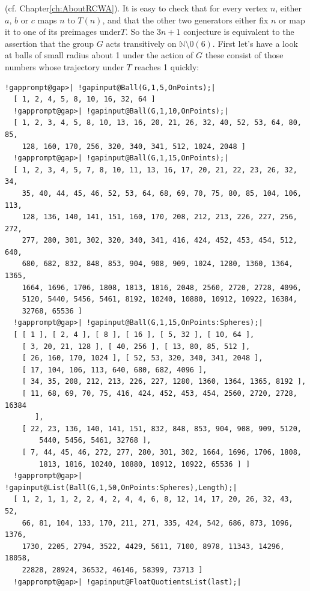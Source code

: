 \documentclass[a4paper,11pt]{report}
\begin{document}
{{   (cf. Chapter{\nobreakspace}\ref{ch:AboutRCWA}). It is easy to check that for every vertex $n$, either $a$, $b$ or $c$ maps $n$ to $T(n)$, and that the other two generators either fix $n$ or map it to one of its preimages under{\nobreakspace}$T$. So the $3n+1$ conjecture is equivalent to the assertion that the group $G$ acts transitively on $\mathbb{N} \setminus 0(6)$. First let's have a look at balls of small radius about 1 under the action of $G$ \texttt{}\texttt{} these consist of those numbers whose
trajectory under $T$ reaches 1 quickly: 
\begin{Verbatim}[commandchars=!@|,fontsize=\small,frame=single,label=Example]
  !gapprompt@gap>| !gapinput@Ball(G,1,5,OnPoints);|
  [ 1, 2, 4, 5, 8, 10, 16, 32, 64 ]
  !gapprompt@gap>| !gapinput@Ball(G,1,10,OnPoints);|
  [ 1, 2, 3, 4, 5, 8, 10, 13, 16, 20, 21, 26, 32, 40, 52, 53, 64, 80, 85, 
    128, 160, 170, 256, 320, 340, 341, 512, 1024, 2048 ]
  !gapprompt@gap>| !gapinput@Ball(G,1,15,OnPoints);|
  [ 1, 2, 3, 4, 5, 7, 8, 10, 11, 13, 16, 17, 20, 21, 22, 23, 26, 32, 34, 
    35, 40, 44, 45, 46, 52, 53, 64, 68, 69, 70, 75, 80, 85, 104, 106, 113, 
    128, 136, 140, 141, 151, 160, 170, 208, 212, 213, 226, 227, 256, 272, 
    277, 280, 301, 302, 320, 340, 341, 416, 424, 452, 453, 454, 512, 640, 
    680, 682, 832, 848, 853, 904, 908, 909, 1024, 1280, 1360, 1364, 1365, 
    1664, 1696, 1706, 1808, 1813, 1816, 2048, 2560, 2720, 2728, 4096, 
    5120, 5440, 5456, 5461, 8192, 10240, 10880, 10912, 10922, 16384, 
    32768, 65536 ]
  !gapprompt@gap>| !gapinput@Ball(G,1,15,OnPoints:Spheres);|
  [ [ 1 ], [ 2, 4 ], [ 8 ], [ 16 ], [ 5, 32 ], [ 10, 64 ], 
    [ 3, 20, 21, 128 ], [ 40, 256 ], [ 13, 80, 85, 512 ], 
    [ 26, 160, 170, 1024 ], [ 52, 53, 320, 340, 341, 2048 ], 
    [ 17, 104, 106, 113, 640, 680, 682, 4096 ], 
    [ 34, 35, 208, 212, 213, 226, 227, 1280, 1360, 1364, 1365, 8192 ], 
    [ 11, 68, 69, 70, 75, 416, 424, 452, 453, 454, 2560, 2720, 2728, 16384 
       ], 
    [ 22, 23, 136, 140, 141, 151, 832, 848, 853, 904, 908, 909, 5120, 
        5440, 5456, 5461, 32768 ], 
    [ 7, 44, 45, 46, 272, 277, 280, 301, 302, 1664, 1696, 1706, 1808, 
        1813, 1816, 10240, 10880, 10912, 10922, 65536 ] ]
  !gapprompt@gap>| !gapinput@List(Ball(G,1,50,OnPoints:Spheres),Length);|
  [ 1, 2, 1, 1, 2, 2, 4, 2, 4, 4, 6, 8, 12, 14, 17, 20, 26, 32, 43, 52, 
    66, 81, 104, 133, 170, 211, 271, 335, 424, 542, 686, 873, 1096, 1376, 
    1730, 2205, 2794, 3522, 4429, 5611, 7100, 8978, 11343, 14296, 18058, 
    22828, 28924, 36532, 46146, 58399, 73713 ]
  !gapprompt@gap>| !gapinput@FloatQuotientsList(last);|

\end{Verbatim}}}
\end{document}
